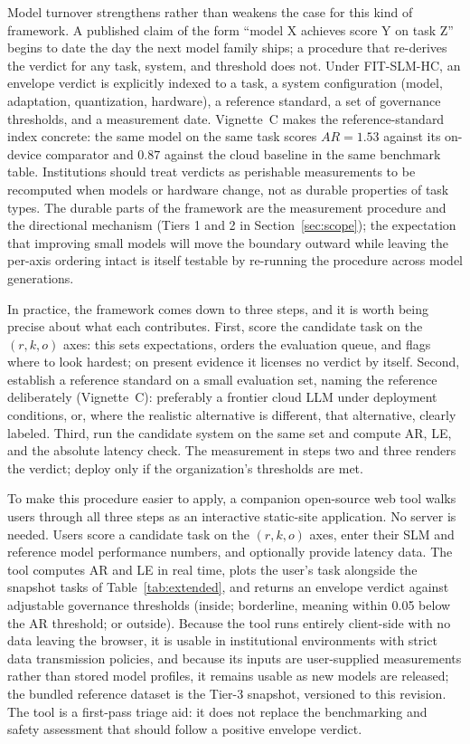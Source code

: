 \documentclass[11pt]{article}
\begin{document}
Model turnover strengthens rather than weakens the case for this kind of framework. A published claim of the form ``model X achieves score Y on task Z'' begins to date the day the next model family ships; a procedure that re-derives the verdict for any task, system, and threshold does not. Under FIT-SLM-HC, an envelope verdict is explicitly indexed to a task, a system configuration (model, adaptation, quantization, hardware), a reference standard, a set of governance thresholds, and a measurement date. Vignette~C makes the reference-standard index concrete: the same model on the same task scores $AR = 1.53$ against its on-device comparator and $0.87$ against the cloud baseline in the same benchmark table. Institutions should treat verdicts as perishable measurements to be recomputed when models or hardware change, not as durable properties of task types. The durable parts of the framework are the measurement procedure and the directional mechanism (Tiers 1 and 2 in Section~\ref{sec:scope}); the expectation that improving small models will move the boundary outward while leaving the per-axis ordering intact is itself testable by re-running the procedure across model generations.

In practice, the framework comes down to three steps, and it is worth being precise about what each contributes. First, score the candidate task on the $(r, k, o)$ axes: this sets expectations, orders the evaluation queue, and flags where to look hardest; on present evidence it licenses no verdict by itself. Second, establish a reference standard on a small evaluation set, naming the reference deliberately (Vignette~C): preferably a frontier cloud LLM under deployment conditions, or, where the realistic alternative is different, that alternative, clearly labeled. Third, run the candidate system on the same set and compute AR, LE, and the absolute latency check. The measurement in steps two and three renders the verdict; deploy only if the organization's thresholds are met.

To make this procedure easier to apply, a companion open-source web tool \cite{Williams2026FITSLMHCTool} walks users through all three steps as an interactive static-site application. No server is needed. Users score a candidate task on the $(r, k, o)$ axes, enter their SLM and reference model performance numbers, and optionally provide latency data. The tool computes AR and LE in real time, plots the user's task alongside the snapshot tasks of Table~\ref{tab:extended}, and returns an envelope verdict against adjustable governance thresholds (inside; borderline, meaning within 0.05 below the AR threshold; or outside). Because the tool runs entirely client-side with no data leaving the browser, it is usable in institutional environments with strict data transmission policies, and because its inputs are user-supplied measurements rather than stored model profiles, it remains usable as new models are released; the bundled reference dataset is the Tier-3 snapshot, versioned to this revision. The tool is a first-pass triage aid: it does not replace the benchmarking and safety assessment that should follow a positive envelope verdict.
\end{document}
